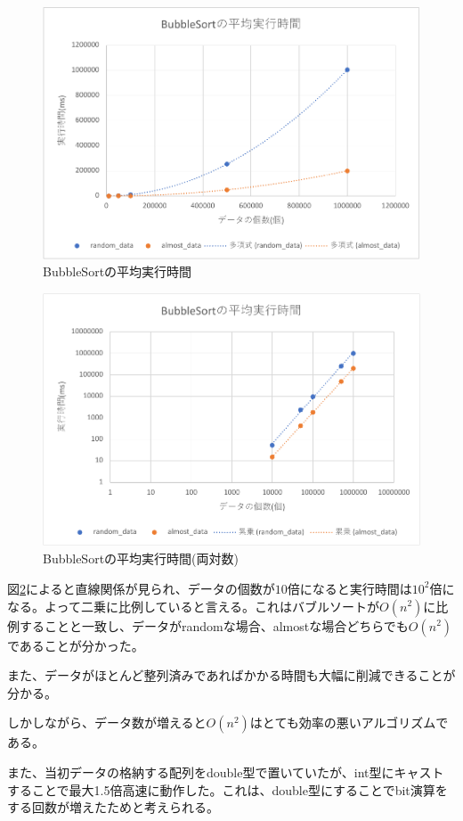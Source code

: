 \documentclass[a4j,dvipdfmx]{jsreport}
\begin{document}
 \begin{figure}[htbp]
    \centering
    \includegraphics[keepaspectratio,width=\linewidth]{figure1.pdf}
    \caption{BubbleSortの平均実行時間}
    \label{fig:BS}
\end{figure}
\clearpage
 \begin{figure}[htbp]
    \centering
    \includegraphics[keepaspectratio,width=\linewidth]{figure1loglog.pdf}
    \caption{BubbleSortの平均実行時間(両対数)}
    \label{fig:BSlog}
\end{figure}

図\ref{fig:BSlog}によると直線関係が見られ、データの個数が$10$倍になると実行時間は$10^2$倍になる。よって二乗に比例していると言える。これはバブルソートが$O(n^2)$に比例することと一致し、データがrandomな場合、almostな場合どちらでも$O(n^2)$であることが分かった。\par
また、データがほとんど整列済みであればかかる時間も大幅に削減できることが分かる。\par
しかしながら、データ数が増えると$O(n^2)$はとても効率の悪いアルゴリズムである。\par
また、当初データの格納する配列をdouble型で置いていたが、int型にキャストすることで最大1.5倍高速に動作した。これは、double型にすることでbit演算をする回数が増えたためと考えられる。
\end{document}
